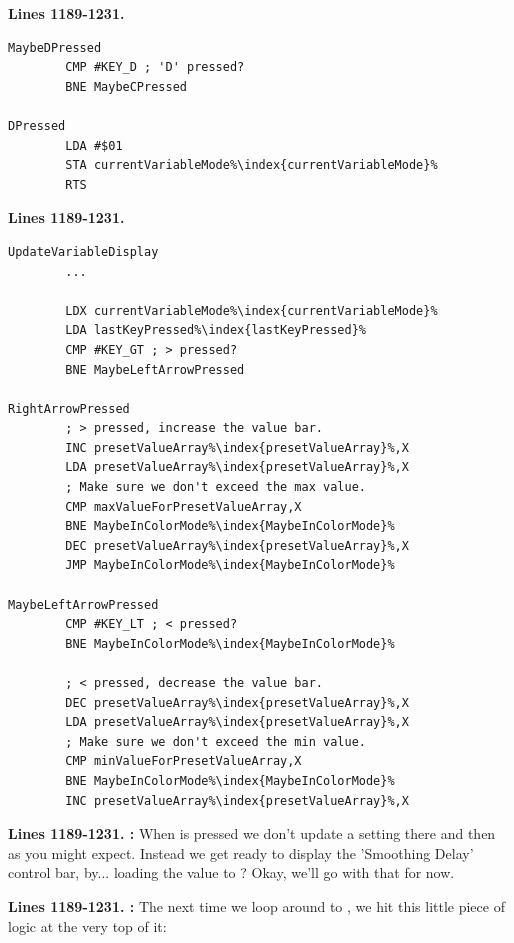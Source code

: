 \textbf{Lines 1189-1231. }
\begin{lstlisting}[caption=From \icode{CheckKeyboardInput\index{CheckKeyboardInput}}.,escapechar=\%]
MaybeDPressed   
        CMP #KEY_D ; 'D' pressed?
        BNE MaybeCPressed

DPressed
        LDA #$01
        STA currentVariableMode%\index{currentVariableMode}%
        RTS 
\end{lstlisting}
\textbf{Lines 1189-1231. }
\begin{lstlisting}[caption=From \icode{CheckKeyboardInputForActiveVariable}.,escapechar=\%]
UpdateVariableDisplay   
        ...

        LDX currentVariableMode%\index{currentVariableMode}%
        LDA lastKeyPressed%\index{lastKeyPressed}%
        CMP #KEY_GT ; > pressed?
        BNE MaybeLeftArrowPressed

RightArrowPressed
        ; > pressed, increase the value bar.
        INC presetValueArray%\index{presetValueArray}%,X
        LDA presetValueArray%\index{presetValueArray}%,X
        ; Make sure we don't exceed the max value.
        CMP maxValueForPresetValueArray,X
        BNE MaybeInColorMode%\index{MaybeInColorMode}%
        DEC presetValueArray%\index{presetValueArray}%,X
        JMP MaybeInColorMode%\index{MaybeInColorMode}%

MaybeLeftArrowPressed   
        CMP #KEY_LT ; < pressed?
        BNE MaybeInColorMode%\index{MaybeInColorMode}%

        ; < pressed, decrease the value bar.
        DEC presetValueArray%\index{presetValueArray}%,X
        LDA presetValueArray%\index{presetValueArray}%,X
        ; Make sure we don't exceed the min value.
        CMP minValueForPresetValueArray,X
        BNE MaybeInColorMode%\index{MaybeInColorMode}%
        INC presetValueArray%\index{presetValueArray}%,X

\end{lstlisting}
\clearpage
\textbf{Lines 1189-1231. :} When  is pressed we don't
update a setting there and then as you might expect. Instead we get ready to display the 'Smoothing
Delay' control bar, by... loading the value  to ? Okay, we'll
go with that for now.

\textbf{Lines 1189-1231. :}  The next time we loop around
to , we hit this little piece of logic at the very top of it:

